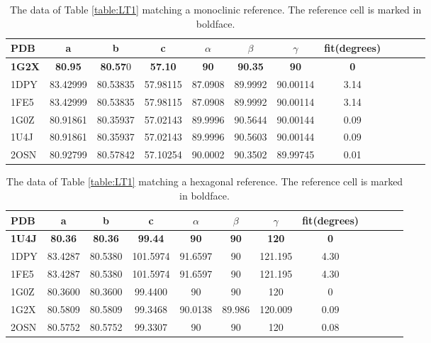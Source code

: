 \documentclass[preprint]{iucr}              %
\numberwithin{equation}{section}
\numberwithin{equation}{section}
\begin{document}
	
	\begin{table}
		\begin{center}
			\caption{The data of Table \ref{table:LT1} matching a monoclinic reference. The 
				reference cell is marked in boldface.}
			\vspace{3mm}
			\begin{tabular}{lccccccccccc}
				\toprule[1pt]
								PDB &   a & b & c & $\alpha$ & $\beta$ & $\gamma$ & fit(degrees) \\ \midrule
\textbf{1G2X} & \textbf{80.95}  & \textbf{80.57}0  & \textbf{57.10}  & \textbf{90}  & \textbf{90.35}  & \textbf{90} & \textbf{0}   \\
1DPY & 83.42999  & 80.53835  & 57.98115  & 87.0908  & 89.9992  & 90.00114 & 3.14          \\
1FE5 & 83.42999 &  80.53835  & 57.98115  & 87.0908  & 89.9992  & 90.00114 & 3.14          \\
1G0Z & 80.91861  & 80.35937  & 57.02143  & 89.9996  & 90.5644  & 90.00144 & 0.09        \\
1U4J & 80.91861  & 80.35937  & 57.02143  & 89.9996  & 90.5603  & 90.00144 & 0.09       \\
2OSN & 80.92799  & 80.57842  & 57.10254  & 90.0002  & 90.3502  & 89.99745 & 0.01      \\

				\bottomrule[1pt]
			\end{tabular}
			\label{table:LT3}
		\end{center}
	\end{table}	
	
	
	\begin{table}
		\begin{center}
			\caption{The data of Table \ref{table:LT1} matching a hexagonal reference. The reference cell is marked in boldface.}
			\vspace{3mm}
			\begin{tabular}{lccccccccccc}
				\toprule
PDB &   a & b & c & $\alpha$ & $\beta$ & $\gamma$ & fit(degrees) \\ \midrule         
\textbf{1U4J} & \textbf{80.36} & \textbf{80.36} & \textbf{99.44} & \textbf{90} & \textbf{90} & \textbf{120} & \textbf{0} \\
1DPY & 83.4287 & 80.5380 & 101.5974 & 91.6597 & 90 & 121.195 & 4.30   \\
1FE5 & 83.4287 & 80.5380 & 101.5974 & 91.6597 & 90 & 121.195 & 4.30   \\
1G0Z & 80.3600 & 80.3600 & 99.4400  & 90 & 90 & 120 & 0          \\
1G2X & 80.5809 & 80.5809 & 99.3468  & 90.0138 & 89.986 & 120.009 & 0.09  \\
2OSN & 80.5752 & 80.5752 & 99.3307  & 90 & 90 & 120 & 0.08  \\

				\bottomrule
			\end{tabular}		
			\label{table:LT4}
		\end{center}
	\end{table}	
	
\end{document}
